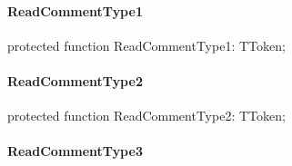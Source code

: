 \documentclass{report}
\newif\ifpdf
\begin{document}
\paragraph*{ReadCommentType1}\hspace*{\fill}

\label{PasDoc_Tokenizer.TTokenizer-ReadCommentType1}
\begin{list}{}{
\setlength{\itemindent}{0cm}
\setlength{\listparindent}{0cm}
\setlength{\leftmargin}{\evensidemargin}
\addtolength{\leftmargin}{\tmplength}
\settowidth{\labelsep}{X}
\addtolength{\leftmargin}{\labelsep}
\setlength{\labelwidth}{\tmplength}
}
\item[\textbf{Declaration}\hfill]
\ifpdf
\begin{flushleft}
\fi
\begin{ttfamily}
protected function ReadCommentType1: TToken;\end{ttfamily}

\ifpdf
\end{flushleft}
\fi

\end{list}
\paragraph*{ReadCommentType2}\hspace*{\fill}

\label{PasDoc_Tokenizer.TTokenizer-ReadCommentType2}
\begin{list}{}{
\setlength{\itemindent}{0cm}
\setlength{\listparindent}{0cm}
\setlength{\leftmargin}{\evensidemargin}
\addtolength{\leftmargin}{\tmplength}
\settowidth{\labelsep}{X}
\addtolength{\leftmargin}{\labelsep}
\setlength{\labelwidth}{\tmplength}
}
\item[\textbf{Declaration}\hfill]
\ifpdf
\begin{flushleft}
\fi
\begin{ttfamily}
protected function ReadCommentType2: TToken;\end{ttfamily}

\ifpdf
\end{flushleft}
\fi

\end{list}
\paragraph*{ReadCommentType3}\hspace*{\fill}
\end{document}
